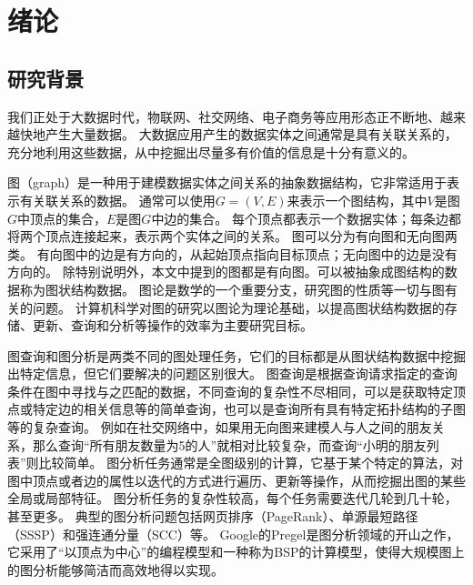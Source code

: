 

\chapter{绪论}
\section{研究背景}
我们正处于大数据时代，物联网、社交网络、电子商务等应用形态正不断地、越来越快地产生大量数据。
大数据应用产生的数据实体之间通常是具有关联关系的，充分地利用这些数据，从中挖掘出尽量多有价值的信息是十分有意义的。

图（graph）是一种用于建模数据实体之间关系的抽象数据结构，它非常适用于表示有关联关系的数据。
通常可以使用$G=(V,E)$来表示一个图结构，其中$V$是图$G$中顶点的集合，$E$是图$G$中边的集合。
每个顶点都表示一个数据实体；每条边都将两个顶点连接起来，表示两个实体之间的关系。
图可以分为有向图和无向图两类。
有向图中的边是有方向的，从起始顶点指向目标顶点；无向图中的边是没有方向的。
除特别说明外，本文中提到的图都是有向图。可以被抽象成图结构的数据称为图状结构数据。
图论是数学的一个重要分支，研究图的性质等一切与图有关的问题。
计算机科学对图的研究以图论为理论基础，以提高图状结构数据的存储、更新、查询和分析等操作的效率为主要研究目标。

图查询和图分析是两类不同的图处理任务，它们的目标都是从图状结构数据中挖掘出特定信息，但它们要解决的问题区别很大。
图查询是根据查询请求指定的查询条件在图中寻找与之匹配的数据，不同查询的复杂性不尽相同，可以是获取特定顶点或特定边的相关信息等的简单查询，也可以是查询所有具有特定拓扑结构的子图等的复杂查询。
例如在社交网络中，如果用无向图来建模人与人之间的朋友关系，那么查询“所有朋友数量为5的人”就相对比较复杂，而查询“小明的朋友列表”则比较简单。
图分析任务通常是全图级别的计算，它基于某个特定的算法，对图中顶点或者边的属性以迭代的方式进行遍历、更新等操作，从而挖掘出图的某些全局或局部特征。
图分析任务的复杂性较高，每个任务需要迭代几轮到几十轮，甚至更多。
典型的图分析问题包括网页排序\cite{pagerank}（PageRank）、单源最短路径（SSSP）和强连通分量（SCC）等。 
Google的Pregel\cite{pregel}是图分析领域的开山之作，它采用了“以顶点为中心”的编程模型和一种称为BSP的计算模型，使得大规模图上的图分析能够简洁而高效地得以实现。

